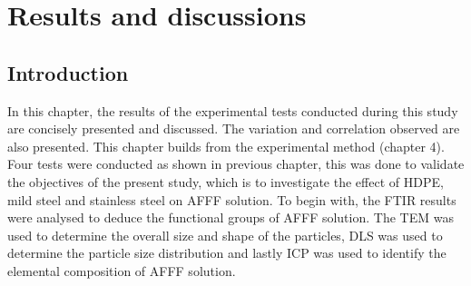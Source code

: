 \chapter{Results and discussions}
\section{Introduction}
In this chapter, the results of the experimental tests conducted during this study are concisely presented and discussed. The variation and correlation observed are also presented. This chapter builds from the experimental method (chapter 4).  Four tests were conducted as shown in previous chapter, this was done to validate the objectives of the present study, which is to investigate the effect of HDPE, mild steel and stainless steel on AFFF solution. 
To begin with, the FTIR results were analysed to deduce the functional groups of AFFF solution. The TEM was used to determine the overall size and shape of the particles, DLS was used to determine the particle size distribution and lastly ICP was used to identify the elemental composition of AFFF solution.  

